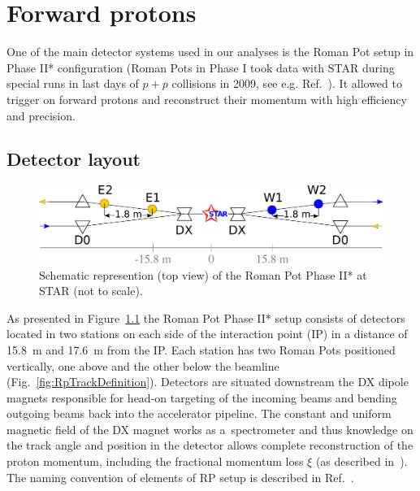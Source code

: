 

\chapter{Forward protons}\label{chap:forwardProtons}

One of the main detector systems used in our analyses is the Roman Pot setup in Phase II* configuration (Roman Pots in Phase I took data with STAR during special runs in last days of $p+p$ collisions in 2009, see e.g. Ref.~\cite{A_N,A_N_note,Sikora:2014hca}). It allowed to trigger on forward protons and reconstruct their momentum with high efficiency and precision.

\section{Detector layout}

\begin{figure}[h]\vspace*{-10pt}%
\centering\includegraphics[width=0.9\linewidth]{graphics/rpSim/RP_phaseII.pdf}%
\caption[Schematic represention (top view) of the Roman Pot Phase II* at STAR.]{Schematic represention (top view) of the Roman Pot Phase II* at STAR (not to scale).}\label{fig:RPphaseII}%
\end{figure}

As presented in Figure~\ref{fig:RPphaseII} the Roman Pot Phase II* setup consists of detectors located in two stations on each side of the interaction point (IP) in a distance of 15.8~m and 17.6~m from the IP. Each station has two Roman Pots positioned vertically, one above and the other below the beamline (Fig.~\ref{fig:RpTrackDefinition}). Detectors are situated downstream the DX dipole magnets responsible for head-on targeting of the incoming beams and bending outgoing beams back into the accelerator pipeline. The constant and uniform magnetic field of the DX magnet works as a~spectrometer and thus knowledge on the track angle and position in the detector allows complete reconstruction of the proton momentum, including the fractional momentum loss $\xi$ (as described in~\cite{MomentumReco}). The naming convention of elements of RP setup is described in Ref.~\cite{Labeling}.

